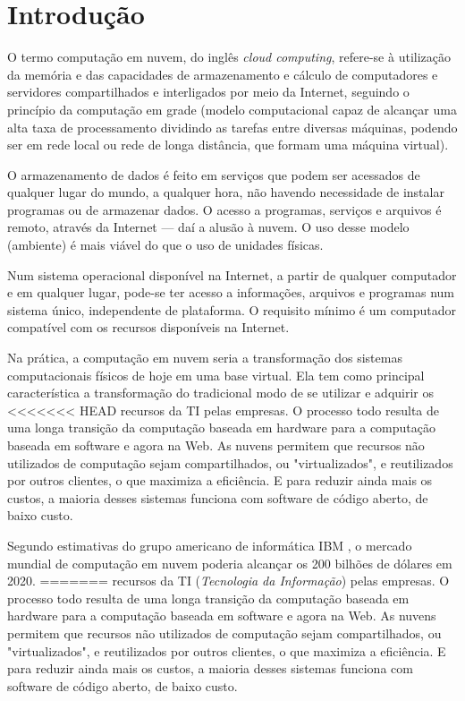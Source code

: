 \section{Introdução}

O termo computação em nuvem, do inglês \emph{cloud computing}, refere-se à
utilização da memória e das capacidades de armazenamento e cálculo de
computadores e servidores compartilhados e interligados por meio da Internet,
seguindo o princípio da computação em grade (modelo computacional capaz de
alcançar uma alta taxa de processamento dividindo as tarefas entre diversas
máquinas, podendo ser em rede local ou rede de longa distância, que formam uma
máquina virtual).

O armazenamento de dados é feito em serviços que podem ser acessados de qualquer
lugar do mundo, a qualquer hora, não havendo necessidade de instalar
programas ou de armazenar dados. O acesso a programas, serviços e arquivos é
remoto, através da Internet --- daí a alusão à nuvem. O uso desse modelo (ambiente)
é mais viável do que o uso de unidades físicas.

Num sistema operacional disponível na Internet, a partir de qualquer computador e em
qualquer lugar, pode-se ter acesso a informações, arquivos e programas num sistema
único, independente de plataforma. O requisito mínimo é um computador compatível
com os recursos disponíveis na Internet.

Na prática, a computação em nuvem seria a transformação dos sistemas
computacionais físicos de hoje em uma base virtual. Ela tem como principal
característica a transformação do tradicional modo de se utilizar e adquirir os
<<<<<<< HEAD
recursos da TI pelas empresas. O processo todo resulta de uma longa transição da
computação baseada em hardware para a computação baseada em software e agora na
Web. As nuvens permitem que recursos não utilizados de computação sejam
compartilhados, ou "virtualizados", e reutilizados por outros clientes, o que
maximiza a eficiência. E para reduzir ainda mais os custos, a maioria desses
sistemas funciona com software de código aberto, de baixo custo.

Segundo estimativas do grupo americano de informática IBM \cite{IBM-cloud-computing},
o mercado mundial de computação em nuvem poderia alcançar os 200 bilhões de dólares
em 2020.
=======
recursos da TI (\emph{Tecnologia da Informação}) pelas empresas. O processo todo
resulta de uma longa transição da computação baseada em hardware para a computação
baseada em software e agora na Web. As nuvens permitem que recursos não utilizados
de computação sejam compartilhados, ou "virtualizados", e reutilizados por outros
clientes, o que maximiza a eficiência. E para reduzir ainda mais os custos, a maioria
desses sistemas funciona com software de código aberto, de baixo custo.

